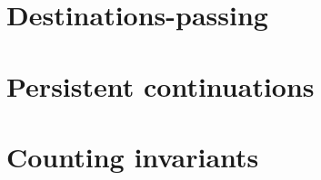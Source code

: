 
\section{Destinations-passing}
\label{sec:gen-destinations}


\section{Persistent continuations}
\label{sec:gen-letcc}

\section{Counting invariants}



\label{sec:pointer-inequality}
